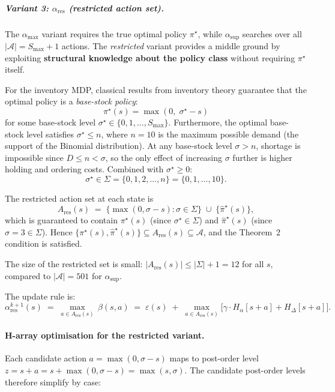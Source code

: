 \documentclass[11pt]{article}
\newcommand{\Smax}{S_{\max}}
\newcommand{\pistar}{\pi^\star}
\newcommand{\pihatstar}{\hat\pi^\star}
\newcommand{\alphares}{\alpha_{\mathrm{res}}}
\begin{document}
\subparagraph{Variant 3: $\alphares$ (restricted action set).}

The $\alpha_{\max}$ variant requires the true optimal policy $\pistar$, while
$\alpha_{\sup}$ searches over all $|\mathcal{A}| = \Smax + 1$ actions.  The
\emph{restricted} variant provides a middle ground by exploiting
\textbf{structural knowledge about the policy class} without requiring
$\pistar$ itself.

For the inventory MDP, classical results from inventory theory guarantee that
the optimal policy is a \emph{base-stock policy}:
\[
  \pistar(s) = \max(0,\; \sigma^\star - s)
\]
for some base-stock level $\sigma^\star \in \{0, 1, \ldots, \Smax\}$.
Furthermore, the optimal base-stock level satisfies $\sigma^\star \le n$,
where $n = 10$ is the maximum possible demand (the support of the Binomial
distribution).  At any base-stock level $\sigma > n$, shortage is impossible
since $D \le n < \sigma$, so the only effect of increasing $\sigma$ further is
higher holding and ordering costs.  Combined with $\sigma^\star \ge 0$:
\[
  \sigma^\star \in \Sigma = \{0, 1, 2, \ldots, n\} = \{0, 1, \ldots, 10\}.
\]

The restricted action set at each state is
\begin{equation}\label{eq:restricted-action-set}
  A_{\mathrm{res}}(s)
  \;=\; \bigl\{\max(0, \sigma - s) : \sigma \in \Sigma\bigr\}
        \;\cup\; \bigl\{\pihatstar(s)\bigr\},
\end{equation}
which is guaranteed to contain $\pistar(s)$ (since $\sigma^\star \in \Sigma$)
and $\pihatstar(s)$ (since $\hat\sigma = 3 \in \Sigma$).  Hence
$\{\pistar(s), \pihatstar(s)\} \subseteq A_{\mathrm{res}}(s) \subseteq
\mathcal{A}$, and the Theorem~2 condition is satisfied.

The size of the restricted set is small: $|A_{\mathrm{res}}(s)| \le
|\Sigma| + 1 = 12$ for all $s$, compared to $|\mathcal{A}| = 501$ for
$\alpha_{\sup}$.

The update rule is:
\begin{equation}\label{eq:alpha-restricted}
  \alpha^{k+1}_{\mathrm{res}}(s)
  \;=\; \max_{a \in A_{\mathrm{res}}(s)}\, \beta(s, a)
  \;=\; \varepsilon(s)
  \;+\; \max_{a \in A_{\mathrm{res}}(s)}
        \bigl[\gamma \cdot H_\alpha[s+a] + H_\Delta[s+a]\bigr].
\end{equation}

\paragraph{H-array optimisation for the restricted variant.}
Each candidate action $a = \max(0, \sigma - s)$ maps to post-order level
$z = s + a = s + \max(0, \sigma - s) = \max(s, \sigma)$.  The candidate
post-order levels therefore simplify by case:
\end{document}
